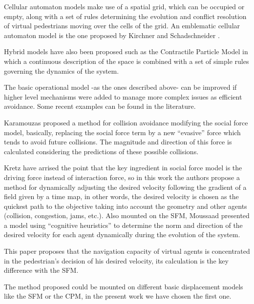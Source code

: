 \documentclass[english]{article}
\begin{document}
    Cellular automaton models make use of a spatial grid, which can be
    occupied or empty, along with a set of rules determining the evolution
    and conflict resolution of virtual pedestrians moving over the cells
    of the grid. An emblematic cellular automaton model is the one proposed
    by Kirchner and Schadschneider \cite{key-kirc2002}.
    
    Hybrid models have also been proposed such as the Contractile Particle
    Model \cite{key-pari2011} in which a continuous description of the
    space is combined with a set of simple rules governing the dynamics
    of the system.
    
    The basic operational model -as the ones described above- can be improved
    if higher level mechanisms were added to manage more complex issues
    as efficient avoidance. Some recent examples can be found in the literature.
    
    Karamouzas \cite{key-kara2009} proposed a method for collision avoidance
    modifying the social force model, basically, replacing the social
    force term by a new ``evasive\textquotedblright{} force which tends
    to avoid future collisions. The magnitude and direction of this force
    is calculated considering the predictions of these possible collisions.
    
    Kretz \cite{key-kret2001} have arrised the point that the key ingredient
    in social force model is the driving force instead of interaction
    force, so in this work the authors propose a method for dynamically
    adjusting the desired velocity following the gradient of a field given
    by a time map, in other words, the desired velocity is chosen as the
    quickest path to the objective taking into account the geometry and
    other agents (collision, congestion, jams, etc.). Also mounted on
    the SFM, Moussaad \cite{key-mous2009} presented a model using ``cognitive
    heuristics'' to determine the norm and direction of the desired velocity
    for each agent dynamically during the evolution of the system.
    
    This paper proposes that the navigation capacity of virtual agents
    is concentrated in the pedestrian's decision of his desired velocity,
    its calculation is the key difference with the SFM.
    
    The method proposed could be mounted on different basic displacement
    models like the SFM or the CPM, in the present work we have chosen
    the first one.
    
    
\end{document}

